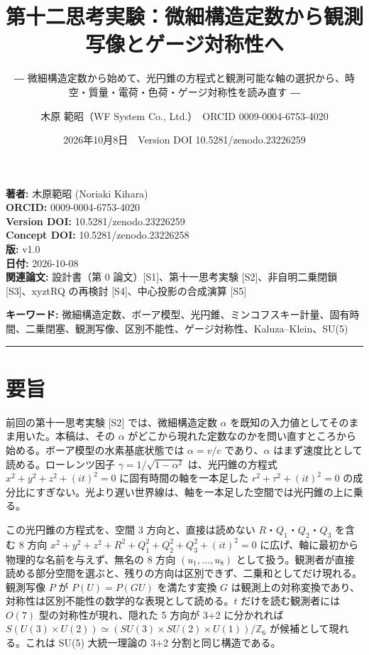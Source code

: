 \documentclass[
  a4paper,
]{ltjsarticle}
\title{第十二思考実験：微細構造定数から観測写像とゲージ対称性へ}
\subtitle{―
微細構造定数から始めて、光円錐の方程式と観測可能な軸の選択から、時空・質量・電荷・色荷・ゲージ対称性を読み直す
―}
\author{木原 範昭（WF System Co., Ltd.）　ORCID 0009-0004-6753-4020}
\date{2026年10月8日　Version DOI 10.5281/zenodo.23226259}
\begin{document}
\maketitle

\textbf{著者:} 木原範昭 (Noriaki Kihara)\\
\textbf{ORCID:} 0009-0004-6753-4020\\
\textbf{Version DOI:} 10.5281/zenodo.23226259\\
\textbf{Concept DOI:} 10.5281/zenodo.23226258\\
\textbf{版:} v1.0\\
\textbf{日付:} 2026-10-08\\
\textbf{関連論文:} 設計書（第 0 論文）{[}S1{]}、第十一思考実験
{[}S2{]}、非自明二乗閉鎖 {[}S3{]}、xyztRQ の再検討
{[}S4{]}、中心投影の合成演算 {[}S5{]}

\textbf{キーワード:}
微細構造定数、ボーア模型、光円錐、ミンコフスキー計量、固有時間、二乗閉塞、観測写像、区別不能性、ゲージ対称性、Kaluza--Klein、SU(5)

\begin{center}\rule{0.5\linewidth}{0.5pt}\end{center}

\section{要旨}\label{ux8981ux65e8}

前回の第十一思考実験 {[}S2{]} では、微細構造定数 \(\alpha\)
を既知の入力値としてそのまま用いた。本稿は、その \(\alpha\)
がどこから現れた定数なのかを問い直すところから始める。ボーア模型の水素基底状態では
\(\alpha=v/c\) であり、\(\alpha\)
はまず速度比として読める。ローレンツ因子 \(\gamma=1/\sqrt{1-\alpha^2}\)
は、光円錐の方程式 \(x^2+y^2+z^2+(it)^2=0\) に固有時間の軸を一本足した
\(r^2+\tau^2+(it)^2=0\)
の成分比にすぎない。光より遅い世界線は、軸を一本足した空間では光円錐の上に乗る。

この光円錐の方程式を、空間 3 方向と、直接は読めない
\(R\)・\(Q_1\)・\(Q_2\)・\(Q_3\) を含む 8 方向
\(x^2+y^2+z^2+R^2+Q_1^2+Q_2^2+Q_3^2+(it)^2=0\)
に広げ、軸に最初から物理的な名前を与えず、無名の 8 方向
\((u_1,\ldots,u_8)\)
として扱う。観測者が直接読める部分空間を選ぶと、残りの方向は区別できず、二乗和としてだけ現れる。観測写像
\(P\) が \(P(U)=P(GU)\) を満たす変換 \(G\)
は観測上の対称変換であり、対称性は区別不能性の数学的な表現として読める。\(t\)
だけを読む観測者には \(O(7)\) 型の対称性が現れ、隠れた 5 方向が 3+2
に分かれれば
\(S(U(3)\times U(2))\simeq(SU(3)\times SU(2)\times U(1))/\mathbb Z_6\)
が候補として現れる。これは SU(5) 大統一理論の 3+2 分割と同じ構造である。
\end{document}
